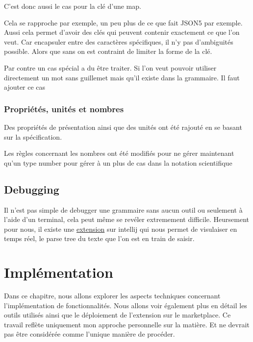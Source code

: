 \documentclass[
    iict, %
    il, %
]{heig-tb}
\begin{document}
C'est donc aussi le cas pour la clé d'une map.

Cela se rapproche par exemple, un peu plus de ce que fait JSON5 par exemple. %
Aussi cela permet d'avoir des clés qui peuvent contenir exactement ce que l'on veut.
Car encapsuler entre des caractères spécifiques, il n'y pas d'ambiguités possible. Alors que sans on est contraint de limiter la forme de la clé.

Par contre un cas spécial a du être traiter. Si l'on veut pouvoir utiliser directement un mot sans guillemet mais qu'il existe dans la grammaire.
Il faut ajouter ce cas %

\subsection{Propriétés, unités et nombres}

Des propriétés de présentation %
ainsi que des unités ont été rajouté en se basant sur la spécification.

Les règles concernant les nombres ont été modifiés pour ne gérer maintenant qu'un type number
pour gérer à un plus de cas dans la notation scientifique

\section{Debugging}

Il n'est pas simple de debugger une grammaire sans aucun outil ou seulement à l'aide d'un terminal, cela peut même se revéler extremement difficile.
Heursement pour nous, il existe une \href{https://plugins.jetbrains.com/plugin/7358-antlr-v4}{extension} sur intellij qui nous permet de visulaiser en temps réel, le parse tree du texte que l'on est en train de saisir.




\chapter{Implémentation}
Dans ce chapitre, nous allons explorer les aspects techniques concernant l'implémentation de fonctionnalités. Nous allons voir également plus en détail les outils utilisés ainsi que le déploiement de l'extension sur le marketplace.
Ce travail reflète uniquement mon approche personnelle sur la matière. Et ne devrait pas être considérée comme l'unique manière de procéder.
\end{document}
